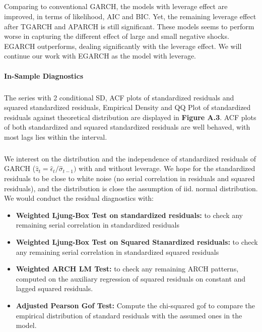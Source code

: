 \documentclass[a4paper]{article}
\begin{document}
\subparagraph*{}
Comparing to conventional GARCH, the models with leverage effect are improved, in terms of likelihood, AIC and BIC. Yet, the remaining leverage effect after TGARCH and APARCH is still significant. These models seems to perform worse in capturing the different effect of large and small negative shocks. EGARCH outperforms, dealing significantly with the leverage effect. We will continue our work with EGARCH as the model with leverage.


\paragraph{In-Sample Diagnostics}
\subparagraph*{}
The series with 2 conditional SD, ACF plots of standardized residuals and squared standardized residuals, Empirical Density and QQ Plot of standardized residuals against theoretical distribution are displayed in \textbf{Figure A.3}. ACF plots of both standardized and squared standardized residuals are well behaved, with most lags lies within the interval. 

\subparagraph*{}
We interest on the distribution and the independence of standardized residuals of GARCH ($\hat{z}_t = \hat{\epsilon}_t / \hat{\sigma}_{t-1})$ with and without leverage. We hope for the standardized residuals to be close to white noise (no serial correlation in residuals and squared residuals), and the distribution is close the assumption of iid. normal distribution. \\

We would conduct the residual diagnostics with:

\begin{itemize}
\item \textbf{Weighted Ljung-Box Test on standardized residuals:} to check any remaining serial correlation in standardized residuals
\item \textbf{Weighted Ljung-Box Test on Squared Stanardized residuals:} to check any remaining serial correlation in standardized squared residuals
\item \textbf{Weighted ARCH LM Test:} to check any remaining ARCH patterns, computed on the auxiliary regression of squared residuals on constant and lagged squared residuals. 
\item \textbf{Adjusted Pearson Gof Test:} Compute the chi-squared gof to compare the empirical distribution of standard residuals with the assumed ones in the model.
\end{itemize}
\end{document}
